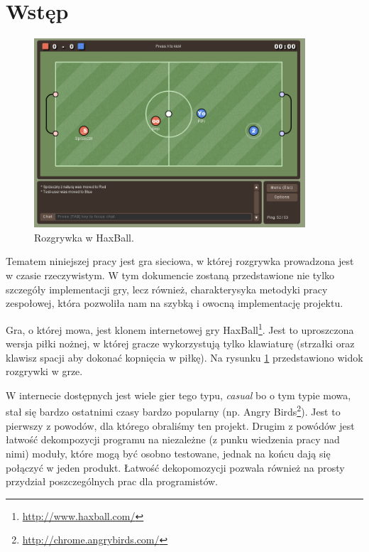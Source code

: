 \section{Wstęp}

\begin{figure}[ht]
    \centering
    \includegraphics[width=0.9\textwidth]{imgs/haxball.png}
    \caption{Rozgrywka w HaxBall.}
    \label{fig:haxball}
\end{figure}

Tematem niniejszej pracy jest gra sieciowa, w której rozgrywka prowadzona jest w czasie rzeczywistym. W tym dokumencie zostaną przedstawione nie tylko szczegóły implementacji gry, lecz również, charakterysyka metodyki pracy zespołowej, która pozwoliła nam na szybką i owocną implementację projektu.

Gra, o której mowa, jest klonem internetowej gry HaxBall\footnote{\hyperref[http://www.haxball.com/]{http://www.haxball.com/}}. Jest to uproszczona wersja piłki nożnej, w której gracze wykorzystują tylko klawiaturę (strzałki oraz klawisz spacji aby dokonać kopnięcia w piłkę). Na rysunku \ref{fig:haxball} przedstawiono widok rozgrywki w grze.

W internecie dostępnych jest wiele gier tego typu, \emph{casual} bo o tym typie mowa, stał się bardzo ostatnimi czasy bardzo popularny (np. Angry Birds\footnote{\hyperref[http://chrome.angrybirds.com/]{http://chrome.angrybirds.com/}}). Jest to pierwszy z powodów, dla którego obraliśmy ten projekt. Drugim z powódów jest łatwość dekompozycji programu na niezależne (z punku wiedzenia pracy nad nimi) moduły, które mogą być osobno testowane, jednak na końcu dają się połączyć w jeden produkt. Łatwość dekopomozycji pozwala również na prosty przydział poszczególnych prac dla programistów.




